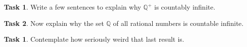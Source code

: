 \documentclass[12pt]{amsart}
\theoremstyle{definition}
\newtheorem{task}{Task}
\newtheorem*{untask}{Task}
\begin{document}
\vspace{2in}

\begin{task}
Write a few sentences to explain why $\mathbb{Q}^+$ is countably infinite.
\end{task}

\vspace{2in}

\begin{task}
Now explain why the set $\mathbb{Q}$ of all rational numbers is countable infinite.
\end{task}

\vspace{1.5in}

\begin{untask}
Contemplate how seriously weird that last result is.
\end{untask}
\end{document}
